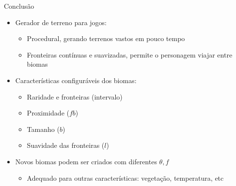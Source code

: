 \begin{frame}{Conclusão}
    \begin{itemize} \setlength\itemsep{1em}
        \item Gerador de terreno para jogos:
        \begin{itemize} 
            \item Procedural, gerando terrenos vastos em pouco tempo
            \item Fronteiras contínuas e suavizadas, permite o personagem viajar entre biomas
        \end{itemize}
        \item Características configuráveis dos biomas:
        \begin{itemize}
            \item Raridade e fronteiras (intervalo)
            \item Proximidade ($fb$)
            \item Tamanho ($b$)
            \item Suavidade das fronteiras ($l$)
        \end{itemize}
        \item Novos biomas podem ser criados com diferentes $\theta, f$
        \begin{itemize}
            \item Adequado para outras características: vegetação, temperatura, etc
        \end{itemize}
    \end{itemize}
    
\end{frame}